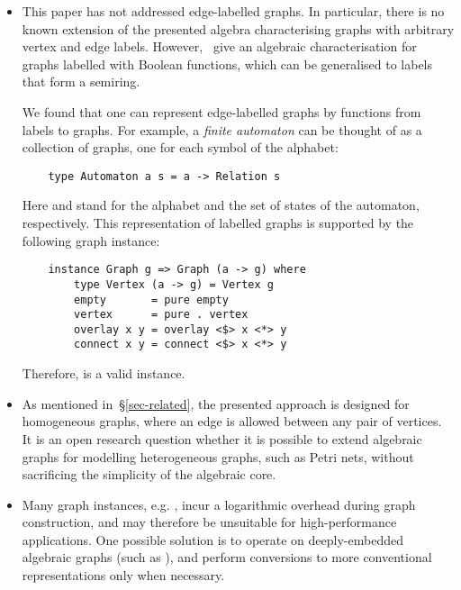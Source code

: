 \begin{itemize}
    \item This paper has not addressed edge-labelled graphs. In particular, there is
    no known extension of the presented algebra characterising graphs with arbitrary
    vertex and edge labels.
    However,~\citet{2014_algebra_mokhov} give an algebraic characterisation for graphs
    labelled with Boolean functions, which can be generalised to labels that form
    a semiring.

    We found that one can represent edge-labelled graphs by functions from labels
    to graphs. For example, a \emph{finite automaton} can be thought of as a collection
    of graphs, one for each symbol of the alphabet:

    \vspace{2mm}
    \begin{verbatim}
    type Automaton a s = a -> Relation s
    \end{verbatim}
    \vspace{2mm}

    \noindent
    Here  and  stand for the alphabet and the set of states of the
    automaton, respectively. This representation of labelled graphs is supported
    by the following graph instance:

    \vspace{2mm}
    \begin{verbatim}
    instance Graph g => Graph (a -> g) where
        type Vertex (a -> g) = Vertex g
        empty       = pure empty
        vertex      = pure . vertex
        overlay x y = overlay <$> x <*> y
        connect x y = connect <$> x <*> y
    \end{verbatim}
    \vspace{2mm}

    \noindent
    Therefore,  is a valid  instance.

    \vspace{0.5mm}
    \item As mentioned in~\S\ref{sec-related}, the presented approach is designed
    for homogeneous graphs, where an edge is allowed between any pair of vertices.
    It is an open research question whether it is possible to extend algebraic graphs
    for modelling heterogeneous graphs, such as Petri nets, without sacrificing the
    simplicity of the algebraic core.

    \vspace{0.5mm}
    \item Many graph instances, e.g. , incur a logarithmic overhead
    during graph construction, and may therefore be unsuitable for
    high-performance applications. One possible solution is to operate on
    deeply-embedded algebraic graphs (such as ), and perform
    conversions to more conventional representations only when necessary.


\end{itemize}
